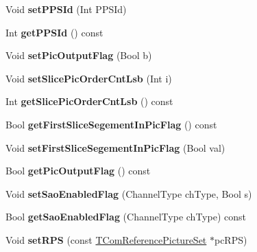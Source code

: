 \begin{DoxyCompactItemize}
Void {\bfseries set\+P\+P\+S\+Id} (Int P\+P\+S\+Id)
\item 
\mbox{\label{class_t_com_slice_a755e4f9e5bb82d73bcacf65140afa4b0}} 
Int {\bfseries get\+P\+P\+S\+Id} () const
\item 
\mbox{\label{class_t_com_slice_a2adcd36a9f0672a4d40712d9d43774d6}} 
Void {\bfseries set\+Pic\+Output\+Flag} (Bool b)
\item 
\mbox{\label{class_t_com_slice_ad0bdf53fc760150f19b290116f1336b8}} 
Void {\bfseries set\+Slice\+Pic\+Order\+Cnt\+Lsb} (Int i)
\item 
\mbox{\label{class_t_com_slice_a2a153bfdd5180aaa65251a23b7653155}} 
Int {\bfseries get\+Slice\+Pic\+Order\+Cnt\+Lsb} () const
\item 
\mbox{\label{class_t_com_slice_a01225b97a7a10721c69220477bf55b93}} 
Bool {\bfseries get\+First\+Slice\+Segement\+In\+Pic\+Flag} () const
\item 
\mbox{\label{class_t_com_slice_a4e2d47af978d1e841208e54da7dff746}} 
Void {\bfseries set\+First\+Slice\+Segement\+In\+Pic\+Flag} (Bool val)
\item 
\mbox{\label{class_t_com_slice_a7b3045c8814544253dd9a0a8308c5d5c}} 
Bool {\bfseries get\+Pic\+Output\+Flag} () const
\item 
\mbox{\label{class_t_com_slice_aee400c23f00cdb2e638b882fcca3243e}} 
Void {\bfseries set\+Sao\+Enabled\+Flag} (Channel\+Type ch\+Type, Bool s)
\item 
\mbox{\label{class_t_com_slice_ac070a6874f258fa8c29d7cdec417c110}} 
Bool {\bfseries get\+Sao\+Enabled\+Flag} (Channel\+Type ch\+Type) const
\item 
\mbox{\label{class_t_com_slice_a3148021c5fbc1c382861ad94099abf9b}} 
Void {\bfseries set\+R\+PS} (const \hyperlink{class_t_com_reference_picture_set}{T\+Com\+Reference\+Picture\+Set} $\ast$pc\+R\+PS)
\item 
\mbox{\label{class_t_com_slice_a9d8c680be9df1e4eb9960d2c9a8fa9ba}} 

\end{DoxyCompactItemize}
